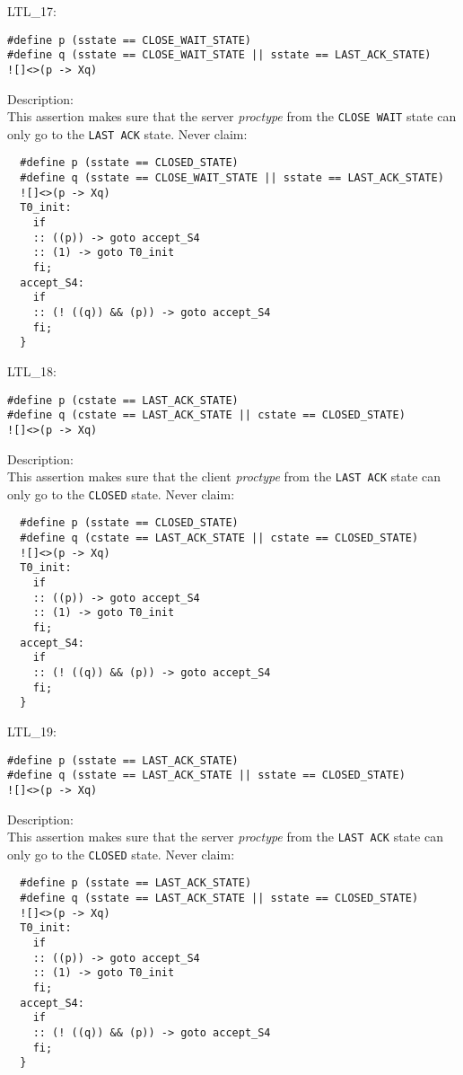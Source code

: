 \documentclass{WigReport}
\begin{document}
LTL\_17:\\
\begin{lstlisting}
#define p (sstate == CLOSE_WAIT_STATE)
#define q (sstate == CLOSE_WAIT_STATE || sstate == LAST_ACK_STATE)
![]<>(p -> Xq)
\end{lstlisting}
Description:\\
This assertion makes sure that the server \textit{proctype} from the \verb|CLOSE WAIT| state can only go to the \verb|LAST ACK| state.
Never claim:\\
\begin{lstlisting}
  #define p (sstate == CLOSED_STATE)
  #define q (sstate == CLOSE_WAIT_STATE || sstate == LAST_ACK_STATE)
  ![]<>(p -> Xq)
  T0_init:
    if
    :: ((p)) -> goto accept_S4
    :: (1) -> goto T0_init
    fi;
  accept_S4:
    if
    :: (! ((q)) && (p)) -> goto accept_S4
    fi;
  }
\end{lstlisting}


LTL\_18:\\
\begin{lstlisting}
#define p (cstate == LAST_ACK_STATE)
#define q (cstate == LAST_ACK_STATE || cstate == CLOSED_STATE)
![]<>(p -> Xq)
\end{lstlisting}
Description:\\
This assertion makes sure that the client \textit{proctype} from the \verb|LAST ACK| state can only go to the \verb|CLOSED| state.
Never claim:\\
\begin{lstlisting}
  #define p (sstate == CLOSED_STATE)
  #define q (cstate == LAST_ACK_STATE || cstate == CLOSED_STATE)
  ![]<>(p -> Xq)
  T0_init:
    if
    :: ((p)) -> goto accept_S4
    :: (1) -> goto T0_init
    fi;
  accept_S4:
    if
    :: (! ((q)) && (p)) -> goto accept_S4
    fi;
  }
\end{lstlisting}


LTL\_19:\\
\begin{lstlisting}
#define p (sstate == LAST_ACK_STATE)
#define q (sstate == LAST_ACK_STATE || sstate == CLOSED_STATE)
![]<>(p -> Xq)
\end{lstlisting}
Description:\\
This assertion makes sure that the server \textit{proctype} from the \verb|LAST ACK| state can only go to the \verb|CLOSED| state.
Never claim:\\
\begin{lstlisting}
  #define p (sstate == LAST_ACK_STATE)
  #define q (sstate == LAST_ACK_STATE || sstate == CLOSED_STATE)
  ![]<>(p -> Xq)
  T0_init:
    if
    :: ((p)) -> goto accept_S4
    :: (1) -> goto T0_init
    fi;
  accept_S4:
    if
    :: (! ((q)) && (p)) -> goto accept_S4
    fi;
  }
\end{lstlisting}
\end{document}

